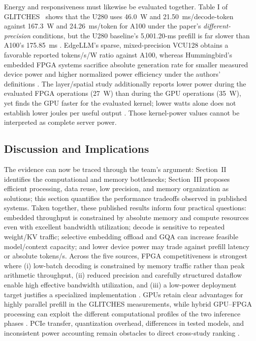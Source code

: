 Energy and responsiveness must likewise be evaluated together. Table I of GLITCHES~\cite{yang2024glitches} shows that the U280 uses 46.0~W and 21.50~ms/decode-token against 167.3~W and 24.26~ms/token for A100 under the paper's \emph{different-precision} conditions, but the U280 baseline's 5,001.20-ms prefill is far slower than A100's 175.85~ms \cite{yang2024glitches}. EdgeLLM's sparse, mixed-precision VCU128 obtains a favorable reported tokens/s/W ratio against A100, whereas Hummingbird's embedded FPGA systems sacrifice absolute generation rate for smaller measured device power and higher normalized power efficiency under the authors' definitions \cite{huang2025edgellm,li2025hummingbird}. The layer/spatial study additionally reports lower power during the evaluated FPGA operations (27~W) than during the GPU operations (35~W), yet finds the GPU faster for the evaluated kernel; lower watts alone does not establish lower joules per useful output \cite{prieto2024comparative}. Those kernel-power values cannot be interpreted as complete server power.

\subsection{Discussion and Implications}
The evidence can now be traced through the team's argument: Section~II identifies the computational and memory bottlenecks; Section~III proposes efficient processing, data reuse, low precision, and memory organization as solutions; this section quantifies the performance tradeoffs observed in published systems. Taken together, these published results inform four practical questions: embedded throughput is constrained by absolute memory and compute resources even with excellent bandwidth utilization; decode is sensitive to repeated weight/KV traffic; selective embedding offload and GQA can increase feasible model/context capacity; and lower device power may trade against prefill latency or absolute tokens/s. Across the five sources, FPGA competitiveness is strongest where (i) low-batch decoding is constrained by memory traffic rather than peak arithmetic throughput, (ii) reduced precision and carefully structured dataflow enable high effective bandwidth utilization, and (iii) a low-power deployment target justifies a specialized implementation \cite{huang2025edgellm,yang2024glitches,li2025hummingbird}. GPUs retain clear advantages for highly parallel prefill in the GLITCHES measurements, while hybrid GPU--FPGA processing can exploit the different computational profiles of the two inference phases \cite{yang2024glitches}. PCIe transfer, quantization overhead, differences in tested models, and inconsistent power accounting remain obstacles to direct cross-study ranking \cite{yang2024glitches,chang2025codesign,prieto2024comparative}.

